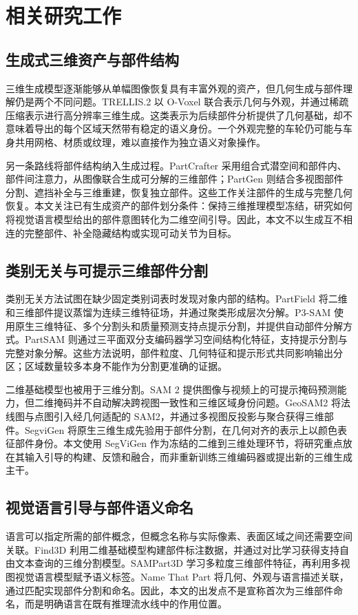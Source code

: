 \section{相关研究工作}
\label{sec:related}

\subsection{生成式三维资产与部件结构}
三维生成模型逐渐能够从单幅图像恢复具有丰富外观的资产，但几何生成与部件理解仍是两个不同问题。TRELLIS.2 以 O-Voxel 联合表示几何与外观，并通过稀疏压缩表示进行高分辨率三维生成\citep{xiang2025trellis2}。这类表示为后续部件分析提供了几何基础，却不意味着导出的每个区域天然带有稳定的语义身份。一个外观完整的车轮仍可能与车身共用网格、材质或纹理，难以直接作为独立语义对象操作。

另一条路线将部件结构纳入生成过程。PartCrafter 采用组合式潜空间和部件内、部件间注意力，从图像联合生成可分解的三维部件\citep{lin2025partcrafter}；PartGen 则结合多视图部件分割、遮挡补全与三维重建，恢复独立部件\citep{chen2024partgen}。这些工作关注部件的生成与完整几何恢复。本文关注已有生成资产的部件划分条件：保持三维推理模型冻结，研究如何将视觉语言模型给出的部件意图转化为二维空间引导。因此，本文不以生成互不相连的完整部件、补全隐藏结构或实现可动关节为目标。

\subsection{类别无关与可提示三维部件分割}
类别无关方法试图在缺少固定类别词表时发现对象内部的结构。PartField 将二维和三维部件提议蒸馏为连续三维特征场，并通过聚类形成层次分解\citep{liu2025partfield}。P3-SAM 使用原生三维特征、多个分割头和质量预测支持点提示分割，并提供自动部件分解方式\citep{ma2025p3sam}。PartSAM 则通过三平面双分支编码器学习空间结构化特征，支持提示分割与完整对象分解\citep{zhu2025partsam}。这些方法说明，部件粒度、几何特征和提示形式共同影响输出分区；区域数量较多本身不能作为分割更准确的证据。

二维基础模型也被用于三维分割。SAM 2 提供图像与视频上的可提示掩码预测能力\citep{ravi2024sam2}，但二维掩码并不自动解决跨视图一致性和三维区域身份问题。GeoSAM2 将法线图与点图引入经几何适配的 SAM2，并通过多视图反投影与聚合获得三维部件\citep{deng2025geosam2}。SegviGen 将原生三维生成先验用于部件分割，在几何对齐的表示上以颜色表征部件身份\citep{li2026segvigen}。本文使用 SegViGen 作为冻结的二维到三维处理环节，将研究重点放在其输入引导的构建、反馈和融合，而非重新训练三维编码器或提出新的三维生成主干。

\subsection{视觉语言引导与部件语义命名}
语言可以指定所需的部件概念，但概念名称与实际像素、表面区域之间还需要空间关联。Find3D 利用二维基础模型构建部件标注数据，并通过对比学习获得支持自由文本查询的三维分割模型\citep{ma2024find3d}。SAMPart3D 学习多粒度三维部件特征，再利用多视图视觉语言模型赋予语义标签\citep{yang2024sampart3d}。Name That Part 将几何、外观与语言描述关联，通过匹配实现部件分割和命名\citep{paul2025namethatpart}。因此，本文的出发点不是宣称首次为三维部件命名，而是明确语言在既有推理流水线中的作用位置。

